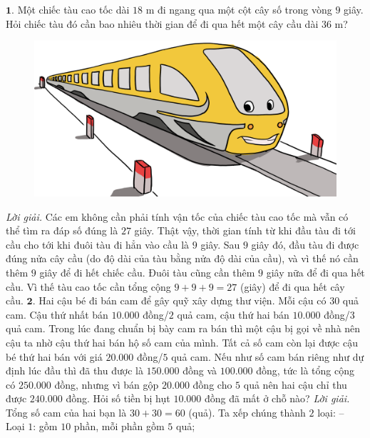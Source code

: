 \begin{multicols}{2}
	$\pmb{1.}$ Một chiếc tàu cao tốc dài $18$ m đi ngang qua một cột cây số trong vòng $9$ giây. Hỏi chiếc tàu đó cần bao nhiêu thời gian để đi qua hết một cây cầu dài $36$ m? 
	\begin{figure}[H]
		\centering
		\vspace*{-10pt}
		\captionsetup{labelformat= empty, justification=centering}
		\includegraphics[width=1\linewidth]{Pi10_ToanBi_Bai1}
		\vspace*{-15pt}
	\end{figure}
	\textit{Lời giải.} 	Các em không cần phải tính vận tốc của chiếc tàu cao tốc mà vẫn có thể tìm ra đáp số đúng là $27$ giây. Thật vậy, thời gian tính từ khi đầu tàu đi tới cầu cho tới khi đuôi tàu đi hẳn vào cầu là $9$ giây. Sau $9$ giây đó, đầu tàu đi được đúng nửa cây cầu (do độ dài của tàu bằng nửa độ dài của cầu), và vì thế nó cần thêm $9$ giây để đi hết chiếc cầu. Đuôi tàu cũng cần thêm $9$ giây nữa để đi qua hết cầu. Vì thế tàu cao tốc cần tổng cộng $9+9+9= 27$ (giây) để đi qua hết cây cầu.
	\vskip 0.1cm
	$\pmb{2.}$ Hai cậu bé đi bán cam để gây quỹ xây dựng thư viện. Mỗi cậu có $30$ quả cam. Cậu thứ nhất bán  $10{.}000$ đồng/$2$ quả cam, cậu thứ hai bán $10{.}000$ đồng/$3$ quả cam. Trong lúc đang chuẩn bị bày cam ra bán thì một cậu bị gọi về nhà nên cậu ta nhờ cậu thứ hai bán hộ số cam của mình. Tất cả số cam còn lại được cậu bé thứ hai bán với giá $20{.}000$ đồng/$5$ quả cam. Nếu như số cam bán riêng như dự định lúc đầu thì đã thu được là $150{.}000$ đồng và $100{.}000$ đồng, tức là tổng cộng có $250{.}000$ đồng, nhưng vì bán gộp $20{.}000$ đồng cho $5$ quả nên  hai cậu chỉ thu được $240{.}000$ đồng. Hỏi số tiền bị hụt $10{.}000$ đồng đã mất ở chỗ nào?
	\vskip 0.1cm
	\textit{Lời giải.} Tổng số cam của hai bạn là  $30 + 30=60$ (quả). Ta xếp chúng thành $2$ loại:
	\vskip 0.1cm
	-- Loại $1$: gồm $10$ phần, mỗi phần gồm $5$ quả;

\end{multicols}
